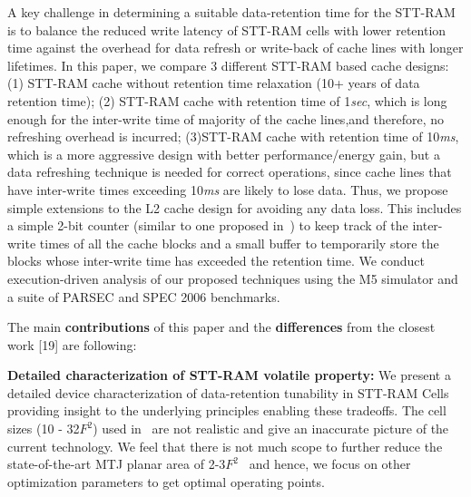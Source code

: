 A key challenge in determining a suitable data-retention time for the STT-RAM is to balance the
reduced write latency of STT-RAM cells with lower retention time against the overhead for data refresh or
write-back of cache lines with longer lifetimes. In this paper, we compare 3 different STT-RAM based
cache designs: (1) STT-RAM cache without retention time relaxation (10+ years of data retention
time); (2) STT-RAM cache with retention time of 1{\it sec}, which is long enough for the inter-write time of
majority of the cache lines,and therefore, no refreshing overhead is incurred; (3)STT-RAM cache with
retention time of 10{\it ms}, which is a more aggressive design with better performance/energy gain, but a
data refreshing technique is needed for correct operations, since cache lines that have inter-write times
exceeding 10{\it ms} are likely to lose data. Thus, we propose simple extensions to the L2 cache design
for avoiding any data loss. This includes a simple 2-bit counter (similar to one proposed
in~\cite{cache-decay-2001}) to keep track of the inter-write times of all the cache blocks and a small buffer
to temporarily store the blocks whose inter-write time has exceeded the retention time. We conduct
execution-driven analysis of our proposed techniques using the M5 simulator and a suite of PARSEC and
SPEC 2006 benchmarks. 

 

The main {\bf contributions} of this paper and the {\bf differences} from the closest work [19] are following:

\noindent\textbf{Detailed characterization of STT-RAM volatile property:} We present a detailed
device characterization of data-retention tunability in STT-RAM Cells providing insight to the
underlying principles enabling these tradeoffs. The cell sizes (10 - 32$F^2$) used in~\cite{STTRAM:HPCA11}  are not realistic
and give an inaccurate picture of the current technology. We feel that there is not much scope to
further reduce the state-of-the-art MTJ planar area of 2-3$F^2$~\cite{STTRAM:Grandis11} and hence, we focus
on other optimization parameters to get optimal operating points. 

